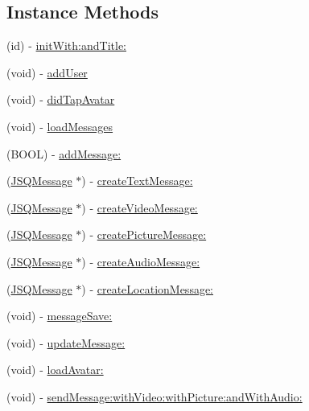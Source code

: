 \subsection*{Instance Methods}
\begin{DoxyCompactItemize}
\item 
(id) -\/ \hyperlink{interface_e_s_chat_view_a6ec8f75cb0c2f0c39b912f9ed12d3b56}{init\+With\+:and\+Title\+:}
\item 
(void) -\/ \hyperlink{interface_e_s_chat_view_a603cc891c9635478a8502c519f3ed706}{add\+User}
\item 
(void) -\/ \hyperlink{interface_e_s_chat_view_ab825e4e694ee3d7e42199eef85040476}{did\+Tap\+Avatar}
\item 
(void) -\/ \hyperlink{interface_e_s_chat_view_adfca3c92c6b7e88a5de929416c6457a8}{load\+Messages}
\item 
(B\+O\+O\+L) -\/ \hyperlink{interface_e_s_chat_view_a9ca8ca78c6eff923615c685e2a0ea7ee}{add\+Message\+:}
\item 
(\hyperlink{interface_j_s_q_message}{J\+S\+Q\+Message} $\ast$) -\/ \hyperlink{interface_e_s_chat_view_a7f4df28472241d9245460745b870035a}{create\+Text\+Message\+:}
\item 
(\hyperlink{interface_j_s_q_message}{J\+S\+Q\+Message} $\ast$) -\/ \hyperlink{interface_e_s_chat_view_a6e5dea59adfd97c0efe9a962bba85dc5}{create\+Video\+Message\+:}
\item 
(\hyperlink{interface_j_s_q_message}{J\+S\+Q\+Message} $\ast$) -\/ \hyperlink{interface_e_s_chat_view_a91f00608c90279de8a260a761c546336}{create\+Picture\+Message\+:}
\item 
(\hyperlink{interface_j_s_q_message}{J\+S\+Q\+Message} $\ast$) -\/ \hyperlink{interface_e_s_chat_view_a690636848cdb2e1af770c87362df97bb}{create\+Audio\+Message\+:}
\item 
(\hyperlink{interface_j_s_q_message}{J\+S\+Q\+Message} $\ast$) -\/ \hyperlink{interface_e_s_chat_view_a0b90d9c790e9b9c4f3ad6219823c8129}{create\+Location\+Message\+:}
\item 
(void) -\/ \hyperlink{interface_e_s_chat_view_a53cf72a1c34fb52e341462d775320305}{message\+Save\+:}
\item 
(void) -\/ \hyperlink{interface_e_s_chat_view_aa66b5195264392b51c7852578f4d8579}{update\+Message\+:}
\item 
(void) -\/ \hyperlink{interface_e_s_chat_view_ab48f2c73ca9c46532139af880238ebb9}{load\+Avatar\+:}
\item 
(void) -\/ \hyperlink{interface_e_s_chat_view_ab707062257d5ed5e0b057e4bc6c933b8}{send\+Message\+:with\+Video\+:with\+Picture\+:and\+With\+Audio\+:}

\end{DoxyCompactItemize}

